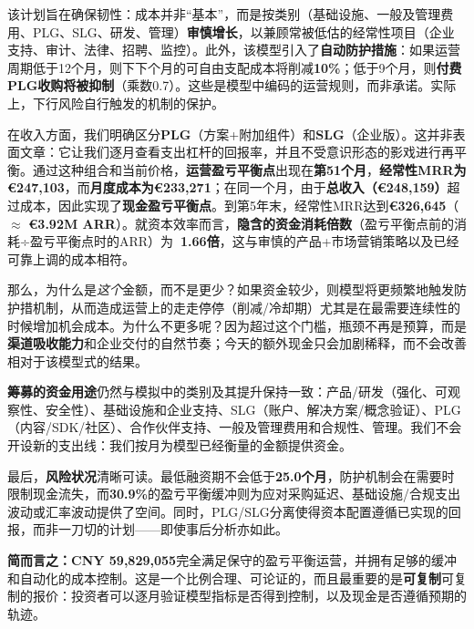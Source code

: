 \documentclass[11点, A4纸, 单面]{article}
\begin{document}
该计划旨在确保韧性：成本并非“基本”，而是按类别（基础设施、一般及管理费用、PLG、SLG、研发、管理）\textbf{审慎增长}，以兼顾常被低估的经常性项目（企业支持、审计、法律、招聘、监控）。此外，该模型引入了\textbf{自动防护措施}：如果运营周期低于12个月，则下下个月的可自由支配成本将削减\textbf{10\%}；低于9个月，则\textbf{付费PLG收购将被抑制}（乘数0.7）。这些是模型中编码的运营规则，而非承诺。实际上，下行风险自行触发的机制的保护。

在收入方面，我们明确区分\textbf{PLG}（方案+附加组件）和\textbf{SLG}（企业版）。这并非表面文章：它让我们逐月查看支出杠杆的回报率，并且不受意识形态的影戏进行再平衡。通过这种组合和当前价格，\textbf{运营盈亏平衡点}出现在\textbf{第51个月}，\textbf{经常性MRR为€247{,}103}，而\textbf{月度成本为€233{,}271}；在同一个月，由于\textbf{总收入（€248{,}159）}超过成本，因此实现了\textbf{现金盈亏平衡点}。到第5年末，经常性MRR达到\textbf{€326{,}645}（$\approx$ \textbf{€3.92M ARR}）。就资本效率而言，\textbf{隐含的资金消耗倍数}（盈亏平衡点前的消耗÷盈亏平衡点时的ARR）为\textbf{~1.66倍}，这与审慎的产品+市场营销策略以及已经可靠上调的成本相符。

那么，为什么是\emph{这个}金额，而不是更少？如果资金较少，则模型将更频繁地触发防护措机制，从而造成运营上的走走停停（削减/冷却期）尤其是在最需要连续性的时候增加机会成本。为什么不更多呢？因为超过这个门槛，瓶颈不再是预算，而是\textbf{渠道吸收能力}和企业交付的自然节奏；今天的额外现金只会加剧稀释，而不会改善相对于该模型式的结果。

\textbf{筹募的资金用途}仍然与模拟中的类别及其提升保持一致：产品/研发（强化、可观察性、安全性）、基础设施和企业支持、SLG（账户、解决方案/概念验证）、PLG（内容/SDK/社区）、合作伙伴支持、一般及管理费用和合规性、管理。我们不会开设新的支出线：我们按月为模型已经衡量的金额提供资金。

最后，\textbf{风险状况}清晰可读。最低融资期不会低于\textbf{25.0个月}，防护机制会在需要时限制现金流失，而\textbf{30.9\%}的盈亏平衡缓冲则为应对采购延迟、基础设施/合规支出波动或汇率波动提供了空间。同时，PLG/SLG分离使得资本配置遵循已实现的回报，而非一刀切的计划——即使事后分析亦如此。

\textbf{简而言之：}\textbf{CNY 59{,}829{,}055}完全满足保守的盈亏平衡运营，并拥有足够的缓冲和自动化的成本控制。这是一个比例合理、可论证的，而且最重要的是\textbf{可复制}可复制的报价：投资者可以逐月验证模型指标是否得到控制，以及现金是否遵循预期的轨迹。
\end{document}
